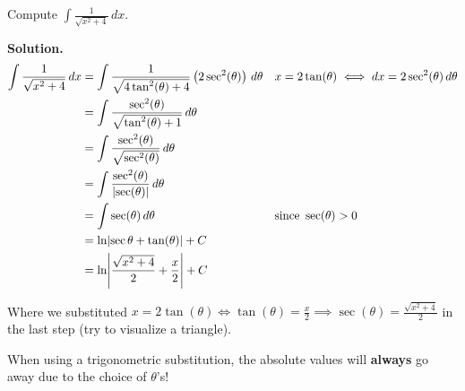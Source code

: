 \begin{Example}{}{}
    Compute $ \displaystyle   \int \frac{1}{\sqrt{x^2+4}} \, d{x} $.

    \textbf{Solution.}
    \begin{align*}
        \int \frac{1}{\sqrt{x^2+4}} \, d{x}
         & =\int \frac{1}{\sqrt{4\tan^2(\theta)+4}} \left(2\sec^2(\theta)\right) \, d{\theta}
         &                                                                                    & x=2\tan(\theta)\iff dx=2\sec^2(\theta)\,d\theta                               \\
         & =\int \frac{\sec^2(\theta)}{\sqrt{\tan^2(\theta)+1}} \, d{\theta}                                                                                                  \\
         & =\int \frac{\sec^2(\theta)}{\sqrt{\sec^2(\theta)}} \, d{\theta}                                                                                                    \\
         & =\int \frac{\sec^2(\theta)}{\abs{\sec(\theta)}} \, d{\theta}                                                                                                       \\
         & =\int \sec(\theta)\, d{\theta}                                                     &                                                 & \text{since }\sec(\theta)>0 \\
         & =\ln\abs{\sec{\theta}+\tan(\theta)}+C                                              &                                                                               \\
         & =\ln\abs*{\frac{\sqrt{x^2+4}}{2}+\frac{x}{2}}+C
    \end{align*}

    Where we substituted $
        \displaystyle x=2\tan(\theta)\iff \tan(\theta)=\frac{x}{2}\implies
        \sec(\theta)=\frac{\sqrt{x^2+4}}{2} $ in the last step (try to visualize a triangle).
\end{Example}

\begin{Remark}{}{}
    When using a trigonometric substitution, the absolute values will \textbf{always}
    go away due to the choice of $ \theta $'s!
\end{Remark}

